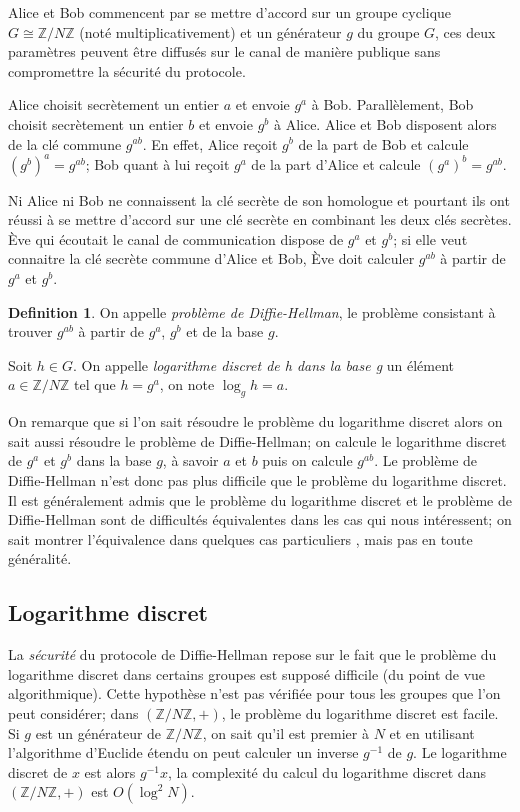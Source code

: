 \documentclass[a4paper,12pt]{article}
\theoremstyle{definition}
\newtheorem{definition}{Definition}[section]
\theoremstyle{remark}
\numberwithin{equation}{section}
\begin{document}
Alice et Bob commencent par se mettre d'accord sur un groupe cyclique $G \cong \mathbb{Z}/N\mathbb{Z}$ (noté multiplicativement) et un générateur $g$ du groupe $G$, ces deux paramètres peuvent être diffusés sur le canal de manière publique sans compromettre la sécurité du protocole.

Alice choisit secrètement un entier $a$ et envoie $g^a$ à Bob. Parallèlement, Bob choisit secrètement un entier $b$ et envoie $g^b$ à Alice. Alice et Bob disposent alors de la clé commune $g^{ab}$. En effet, Alice reçoit $g^b$ de la part de Bob et calcule $(g^b)^a = g^{ab}$; Bob quant à lui reçoit $g^a$ de la part d'Alice et calcule $(g^a)^b = g^{ab}$.

Ni Alice ni Bob ne connaissent la clé secrète de son homologue et pourtant ils ont réussi à se mettre d'accord sur une clé secrète en combinant les deux clés secrètes. Ève qui écoutait le canal de communication dispose de $g^a$ et $g^b$; si elle veut connaitre la clé secrète commune d'Alice et Bob, Ève doit calculer $g^{ab}$ à partir de $g^a$ et $g^b$.

\begin{definition}
On appelle \emph{problème de Diffie-Hellman}, le problème consistant à trouver $g^{ab}$ à partir de $g^a$, $g^b$ et de la base $g$.

Soit $h \in G$. On appelle \emph{logarithme discret de h dans la base g} un élément $a \in \mathbb{Z}/N\mathbb{Z}$ tel que $h=g^a$, on note $\log_g h = a$.
\end{definition}

On remarque que si l'on sait résoudre le problème du logarithme discret alors on sait aussi résoudre le problème de Diffie-Hellman; on calcule le logarithme discret de $g^a$ et $g^b$ dans la base $g$, à savoir $a$ et $b$ puis on calcule $g^{ab}$. Le problème de Diffie-Hellman n'est donc pas plus difficile que le problème du logarithme discret. Il est généralement admis que le problème du logarithme discret et le problème de Diffie-Hellman sont de difficultés équivalentes dans les cas qui nous intéressent; on sait montrer l'équivalence dans quelques cas particuliers \citep{maurer} \citep{muzereau},
mais pas en toute généralité.

\subsection{Logarithme discret}
La \emph{sécurité} du protocole de Diffie-Hellman repose sur le fait que le problème du logarithme discret dans certains groupes est supposé difficile (du point de vue algorithmique). Cette hypothèse n'est pas vérifiée pour tous les groupes que l'on peut considérer; dans $(\mathbb{Z}/N\mathbb{Z},+)$, le problème du logarithme discret est facile. Si $g$ est un générateur de $\mathbb{Z}/N\mathbb{Z}$, on sait qu'il est premier à $N$ et en utilisant l'algorithme d'Euclide étendu on peut calculer un inverse $g^{-1}$ de $g$. Le logarithme discret de $x$ est alors $g^{-1}x$, la complexité du calcul du logarithme discret dans $(\mathbb{Z}/N\mathbb{Z},+)$ est $O(\log^2N)$.
\end{document}
